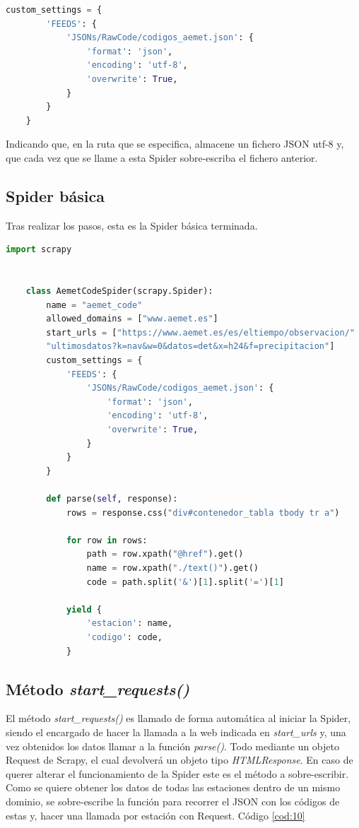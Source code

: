 \begin{lstlisting}[language=Python, caption={Confugurar guardado en JSON mediante \textit{custom\_settings}}, label=cod:9]
	custom_settings = {
		'FEEDS': {
			'JSONs/RawCode/codigos_aemet.json': {
				'format': 'json',
				'encoding': 'utf-8',
				'overwrite': True,
			}
		}
	}
\end{lstlisting}

Indicando que, en la ruta que se especifica, almacene un fichero JSON utf-8 y, que cada vez que se llame a esta Spider sobre-escriba el fichero anterior.

\subsection{Spider básica}
Tras realizar los pasos, esta es la Spider básica terminada.

\begin{lstlisting}[language=Python, caption={Spider de ejemplo (Aemet Code Spider)}]
	import scrapy
	
	
	class AemetCodeSpider(scrapy.Spider):
		name = "aemet_code"
		allowed_domains = ["www.aemet.es"]
		start_urls = ["https://www.aemet.es/es/eltiempo/observacion/"
		"ultimosdatos?k=nav&w=0&datos=det&x=h24&f=precipitacion"]
		custom_settings = {
			'FEEDS': {
				'JSONs/RawCode/codigos_aemet.json': {
					'format': 'json',
					'encoding': 'utf-8',
					'overwrite': True,
				}
			}
		}
	
		def parse(self, response):
			rows = response.css("div#contenedor_tabla tbody tr a")
			
			for row in rows:
				path = row.xpath("@href").get()
				name = row.xpath("./text()").get()
				code = path.split('&')[1].split('=')[1]
			
			yield {
				'estacion': name,
				'codigo': code,
			}
\end{lstlisting}

\subsection{Método \textit{start\_requests()}}
\label{Chap514}
El método \textit{start\_requests()} es llamado de forma automática al iniciar la Spider, siendo el encargado de hacer la llamada a la web indicada en \textit{start\_urls} y, una vez obtenidos los datos llamar a la función \textit{parse()}. Todo mediante un objeto Request de Scrapy, el cual devolverá un objeto tipo \textit{HTMLResponse}. En caso de querer alterar el funcionamiento de la Spider este es el método a sobre-escribir.\newline
\newline
Como se quiere obtener los datos de todas las estaciones dentro de un mismo dominio, se sobre-escribe la función para recorrer el JSON con los códigos de estas y, hacer una llamada por estación con Request. Código \ref{cod:10}

